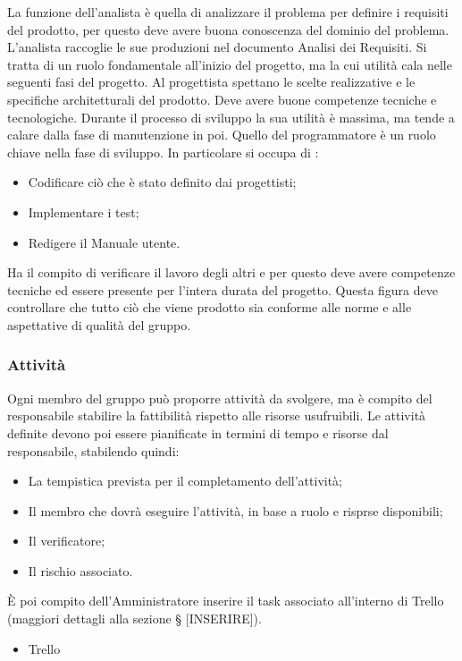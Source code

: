 La funzione dell'analista è quella di analizzare il problema per definire i requisiti del prodotto, per questo deve avere buona conoscenza del dominio del problema. L'analista raccoglie le sue produzioni nel documento Analisi dei Requisiti. Si tratta di un ruolo fondamentale all'inizio del progetto, ma la cui utilità cala nelle seguenti fasi del progetto.
Al progettista spettano le scelte realizzative e le specifiche architetturali del prodotto. Deve avere buone competenze tecniche e tecnologiche. Durante il processo di sviluppo la sua utilità è massima, ma tende a calare dalla fase di manutenzione in poi.
Quello del programmatore è un ruolo chiave nella fase di sviluppo. In particolare si occupa di :
\begin{itemize}
    \item Codificare ciò che è stato definito dai progettisti;
    \item Implementare i test;
    \item Redigere il Manuale utente.
\end{itemize}
Ha il compito di verificare il lavoro degli altri e per questo deve avere competenze tecniche ed essere presente per l'intera durata del progetto. Questa figura deve controllare che tutto ciò che viene prodotto sia conforme alle norme e alle aspettative di qualità del gruppo.


\subsubsection{Attività}
Ogni membro del gruppo può proporre attività da svolgere, ma è compito del responsabile stabilire la fattibilità rispetto alle risorse usufruibili. 
Le attività definite devono poi essere pianificate in termini di tempo e risorse dal responsabile, stabilendo quindi:
\begin{itemize}
    \item La tempistica prevista per il completamento dell'attività;
    \item Il membro che dovrà eseguire l'attività, in base a ruolo e risprse disponibili;
    \item Il verificatore;
    \item Il rischio associato.
\end{itemize}
È poi compito dell'Amministratore inserire il task associato all'interno di Trello (maggiori dettagli alla sezione § [INSERIRE]).
    \begin{itemize}
        \item Trello
    \end{itemize}

